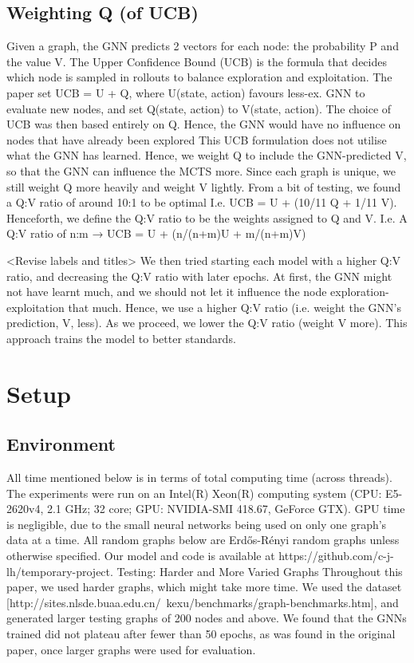 \documentclass{article}
\begin{document}
\subsection{Weighting Q (of UCB)}
Given a graph, the GNN predicts 2 vectors for each node: the probability P and the value V. The Upper Confidence Bound (UCB) is the formula that decides which node is sampled in rollouts to balance exploration and exploitation. The paper set UCB = U + Q, where U(state, action) favours less-ex. GNN to evaluate new nodes, and set Q(state, action) to V(state, action). The choice of UCB was then based entirely on Q. Hence, the GNN would have no influence on nodes that have already been explored  
This UCB formulation does not utilise what the GNN has learned. Hence, we weight Q to include the GNN-predicted V, so that the GNN can influence the MCTS more. Since each graph is unique, we still weight Q more heavily and weight V lightly. From a bit of testing, we found a Q:V ratio of around 10:1 to be optimal 
I.e. UCB = U + (10/11 Q + 1/11 V). 
Henceforth, we define the Q:V ratio to be the weights assigned to Q and V.
I.e. A Q:V ratio of n:m → UCB = U + (n/(n+m)U + m/(n+m)V)

<Revise labels and titles>
We then tried starting each model with a higher Q:V ratio, and decreasing the Q:V ratio with later epochs.
At first, the GNN might not have learnt much, and we should not let it influence the node exploration-exploitation that much. Hence, we use a higher Q:V ratio (i.e. weight the GNN’s prediction, V, less). As we proceed, we lower the Q:V ratio (weight V more). This approach trains the model to better standards.
\section{Setup}
\subsection{Environment}
All time mentioned below is in terms of total computing time (across threads). The experiments were run on an Intel(R) Xeon(R) computing system (CPU: E5-2620v4, 2.1 GHz; 32 core; GPU: NVIDIA-SMI 418.67, GeForce GTX). GPU time is negligible, due to the small neural networks being used on only one graph’s data at a time.
All random graphs below are Erdős-Rényi random graphs unless otherwise specified.
Our model and code is available at https://github.com/c-j-lh/temporary-project.
Testing: Harder and More Varied Graphs
Throughout this paper, we used harder graphs, which might take more time. We used the dataset [http://sites.nlsde.buaa.edu.cn/~kexu/benchmarks/graph-benchmarks.htm], and generated larger testing graphs of 200 nodes and above. We found that the GNNs trained did not plateau after fewer than 50 epochs, as was found in the original paper, once larger graphs were used for evaluation.
\end{document}
